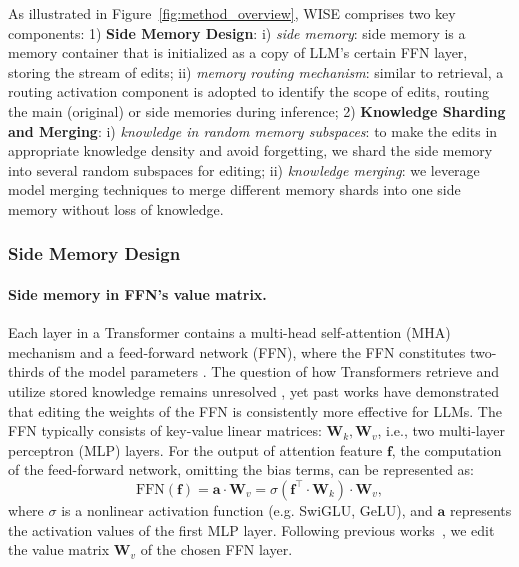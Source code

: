As illustrated in Figure~\ref{fig:method_overview}, WISE comprises two key components: 
1) \textbf{Side Memory Design}: i) \textit{side memory}: side memory is a memory container that is initialized as a copy of LLM's certain FFN layer, storing the stream of edits; ii) \textit{memory routing mechanism}: similar to retrieval, a routing activation component is adopted to identify the scope of edits, routing the main (original) or side memories during inference; 
2) \textbf{Knowledge Sharding and Merging}: i) \textit{knowledge in random memory subspaces}: to make the edits in appropriate knowledge density and avoid forgetting, we shard the side memory into several random subspaces for editing; ii) \textit{knowledge merging}: we leverage model merging techniques to merge different memory shards into one side memory without loss of knowledge.

\subsubsection{Side Memory Design} \label{subsec:side_memory}
\paragraph{Side memory in FFN's value matrix.} 
Each layer in a Transformer contains a multi-head self-attention (MHA) mechanism and a feed-forward network (FFN), where the FFN constitutes two-thirds of the model parameters \cite{geva-etal-2021-transformer}.
The question of how Transformers retrieve and utilize stored knowledge remains unresolved \cite{rome, niu2024what}, yet past works \cite{mend, geva-etal-2021-transformer} have demonstrated that editing the weights of the FFN is consistently more effective for LLMs.
The FFN typically consists of key-value linear matrices: $\mathbf{W}_k, \mathbf{W}_v$, i.e., two multi-layer perceptron (MLP) layers.
For the output of attention feature $\mathbf{f}$, the computation of the feed-forward network, omitting the bias terms, can be represented as:
\begin{equation}
    \text{FFN}(\mathbf{f}) = \mathbf{a} \cdot \mathbf{W}_v = \sigma({\mathbf{f}}^\top \cdot \mathbf{W}_k) \cdot \mathbf{W}_v,
    \label{equ:ffn_function}
\end{equation}
where $\sigma$ is a nonlinear activation function (e.g. SwiGLU, GeLU), and $\mathbf{a}$ represents the activation values of the first MLP layer. 
Following previous works~\cite{rome,geva-etal-2021-transformer}, we edit the value matrix $\mathbf{W}_{v}$ of the chosen FFN layer. 

